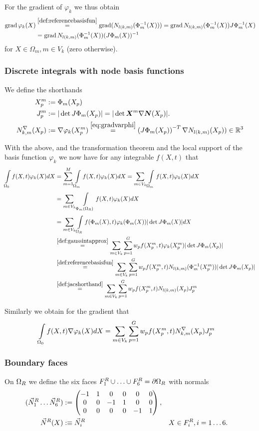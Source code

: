 For the gradient of $\varphi_k$ we thus obtain
\begin{align}
	\grad\varphi_k(X) &\re{def:referencebasisfun} \grad (N_{l(k,m)}(\Phi^{-1}_m(X)))
					  = \grad N_{l(k,m)}(\Phi^{-1}_m(X))J\Phi^{-1}_m(X)\nonumber\\
					  &= \grad N_{l(k,m)}(\Phi^{-1}_m(X))(J\Phi_m(X))^{-1}\label{eq:gradvarphi}
\end{align}
for $X\in\Omega_m, m\in V_k$ (zero otherwise).
 
\subsubsection{Discrete integrals with node basis functions}
We define the shorthands
\begin{align}
	\pmp &:= \Phi_m(X_p)\\
	\jmp &:= |\det J\Phi_m(X_p)| = |\det \vX^m\nabla\vN(X_p)|.\label{def:jacshorthand}\\
	\dNkmp &:= \nabla\varphi_k(\pmp) \re{eq:gradvarphi} \left(J\Phi_m(X_p)\right)^{-T}\nabla \Nkmp)\in\R^3\label{}
\end{align}

With the above, and the transformation theorem and the local support of the basis function $\varphi_k$ we now have for any integrable $f(X,t)$ that
\begin{align}
   \intl{\Or}{}f(X,t)\varphi_k(X)dX &= \suml{m=1}{M}\intl{\Omega_m}{}f(X,t)\varphi_k(X)dX = \sumvk\intl{\Omega_m}{}f(X,t)\varphi_k(X)dX\nonumber\\
    &= \sumvk\intl{\Phi_m(\Om)}{}f(X,t)\varphi_k(X)dX\nonumber\\
	&= \sumvk\intl{\Om}{}f(\Phi_m(X),t)\varphi_k(\Phi_m(X))|\det J\Phi_m(X)|dX\nonumber\\
	& \re{def:gaussintapprox} \sumvk\sumgp w_pf(\pmp,t)\varphi_k(\pmp)|\det J\Phi_m(X_p)|\nonumber\\
	& \re{def:referencebasisfun} \sumvk\sumgp w_pf(\pmp,t)N_{l(k,m)}(\Phi_m^{-1}(\pmp))|\det J\Phi_m(X_p)|\nonumber\\
	& \re{def:jacshorthand} \sumvk\sumgp w_pf(\pmp,t)\Nkmp\jmp\label{eq:fphidx}
\end{align}

Similarly we obtain for the gradient that
\begin{align}
	\int\limits_{\Omega_0}^{}f(X,t)\nabla\varphi_k(X)dX &= \sum\limits_{m\in V_k}^{}\sum\limits_{p=1}^{G} w_pf(X^m_p,t)N^\nabla_{k,m}(X_p)J^m_p\label{eq:fgradphidx}
\end{align}

\subsubsection{Boundary faces}
On $\Omega_R$ we define the six faces $F_1^R \cup \ldots \cup F_6^R = \partial\Omega_R$ with normals
\begin{align*}
	(\vec{N}^R_1 \ldots \vec{N}^R_6) &:= \left(\begin{matrix}-1 & 1 & 0 & 0 & 0 & 0\\0 & 0 & -1 & 1 & 0 & 0\\0 & 0 & 0 & 0 & -1 & 1\end{matrix}\right),\\
	\vec{N}^R(X) &:\equiv \vec{N}^R_i && X\in F^R_i, i=1\ldots 6.
\end{align*}

